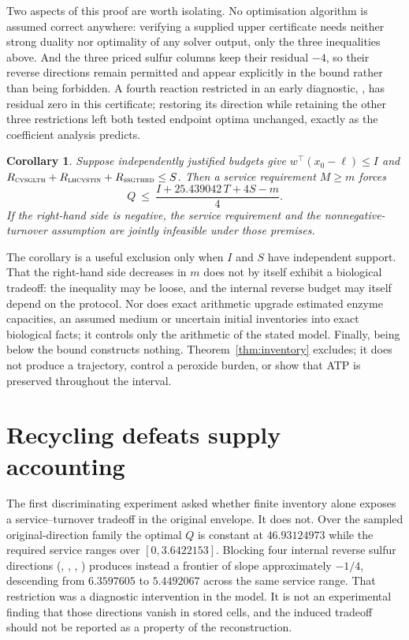 \documentclass[11pt,a4paper]{article}
\theoremstyle{plain}
\newtheorem{corollary}[theorem]{Corollary}
\theoremstyle{definition}
\theoremstyle{remark}
\newcommand{\rx}[1]{\textnormal{\textsc{#1}}}
\begin{document}
Two aspects of this proof are worth isolating. No optimisation algorithm is
assumed correct anywhere: verifying a supplied upper certificate needs neither
strong duality nor optimality of any solver output, only the three inequalities
above. And the three priced sulfur columns keep their residual $-4$, so their
reverse directions remain permitted and appear explicitly in the bound rather
than being forbidden. A fourth reaction restricted in an early diagnostic,
, has residual zero in this certificate; restoring its
direction while retaining the other three restrictions left both tested
endpoint optima unchanged, exactly as the coefficient analysis predicts.

\begin{corollary}\label{cor:exclusion}
Suppose independently justified budgets give $w^{\top}(x_0-\ell)\le I$ and
$R_{\rx{cysglth}}+R_{\rx{lhcystin}}+R_{\rx{ssgthrd}}\le S$. Then a service
requirement $M\ge m$ forces
\begin{equation}\label{eq:tradeoff}
Q\ \le\ \frac{I+25.439042\,T+4S-m}{4} .
\end{equation}
If the right-hand side is negative, the service requirement and the
nonnegative-turnover assumption are jointly infeasible under those premises.
\end{corollary}

The corollary is a useful exclusion only when $I$ and $S$ have independent
support. That the right-hand side decreases in $m$ does not by itself exhibit a
biological tradeoff: the inequality may be loose, and the internal reverse
budget may itself depend on the protocol. Nor does exact arithmetic upgrade
estimated enzyme capacities, an assumed medium or uncertain initial inventories
into exact biological facts; it controls only the arithmetic of the stated
model. Finally, being below the bound constructs nothing. Theorem~\ref{thm:inventory}
excludes; it does not produce a trajectory, control a peroxide burden, or show
that ATP is preserved throughout the interval.

\section{Recycling defeats supply accounting}\label{sec:recycling}

The first discriminating experiment asked whether finite inventory alone
exposes a service--turnover tradeoff in the original envelope. It does not.
Over the sampled original-direction family the optimal $Q$ is constant at
$46.93124973$ while the required service ranges over $[0,3.6422153]$. Blocking
four internal reverse sulfur directions (, ,
, ) produces instead a frontier of slope
approximately $-1/4$, descending from $6.3597605$ to $5.4492067$ across the
same service range. That restriction was a diagnostic intervention in the
model. It is not an experimental finding that those directions vanish in stored
cells, and the induced tradeoff should not be reported as a property of the
reconstruction.
\end{document}
